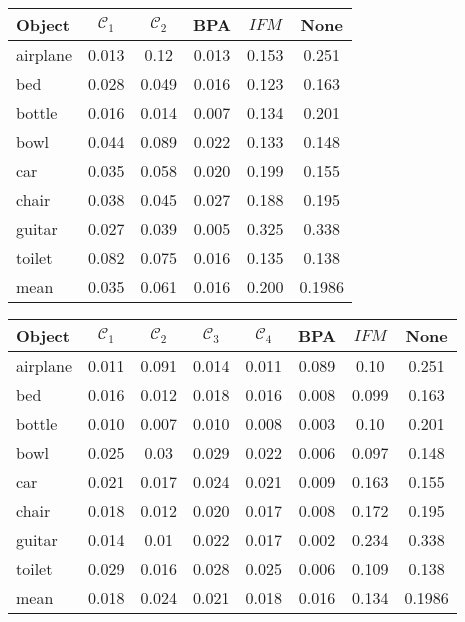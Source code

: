 \begin{center}
     \label{tab:distance256opt} 
    \begin{tabular}{| l  | c  | c | c | c || c |}
        \hline
        Object& $\mathcal{C}_1$ & $\mathcal{C}_2$ & BPA & $IFM$  & None\\ \hline
        airplane&0.013&0.12&0.013&0.153&0.251\\\hline
        bed&0.028&0.049&0.016&0.123&0.163\\\hline 
        bottle&0.016&0.014&0.007&0.134&0.201\\\hline
        bowl&0.044&0.089&0.022&0.133&0.148\\\hline
        car&0.035&0.058&0.020&0.199&0.155\\\hline
        chair&0.038&0.045&0.027&0.188&0.195\\\hline
        guitar&0.027&0.039&0.005&0.325&0.338\\\hline
        toilet&0.082&0.075&0.016&0.135&0.138\\\hline\hline
        mean&0.035&0.061&0.016&0.200&0.1986\\        \hline
    \end{tabular}
\end{center}
\begin{center}
     \label{tab:distance1024opt} 
    \begin{tabular}{| l  | c | c | c | c | c | c || c |}
        \hline
        Object& $\mathcal{C}_1$ & $\mathcal{C}_2$ & $\mathcal{C}_3$ & $\mathcal{C}_4$ & BPA & $IFM$ & None\\ \hline
        airplane&0.011&0.091&0.014&0.011&0.089&0.10 & 0.251\\\hline
        bed&0.016&0.012&0.018&0.016&0.008&0.099 & 0.163\\        \hline
        bottle&0.010&0.007&0.010&0.008&0.003&0.10 & 0.201\\        \hline
        bowl&0.025&0.03&0.029&0.022&0.006&0.097& 0.148\\        \hline
        car&0.021&0.017&0.024&0.021&0.009&0.163& 0.155\\        \hline
        chair&0.018&0.012&0.020&0.017&0.008&0.172& 0.195\\        \hline
        guitar&0.014&0.01&0.022&0.017&0.002&0.234 & 0.338\\        \hline
        toilet&0.029&0.016&0.028&0.025&0.006&0.109 & 0.138\\        \hline\hline
        mean&0.018&0.024&0.021&0.018&0.016&0.134 & 0.1986\\        \hline
    \end{tabular}
\end{center}
